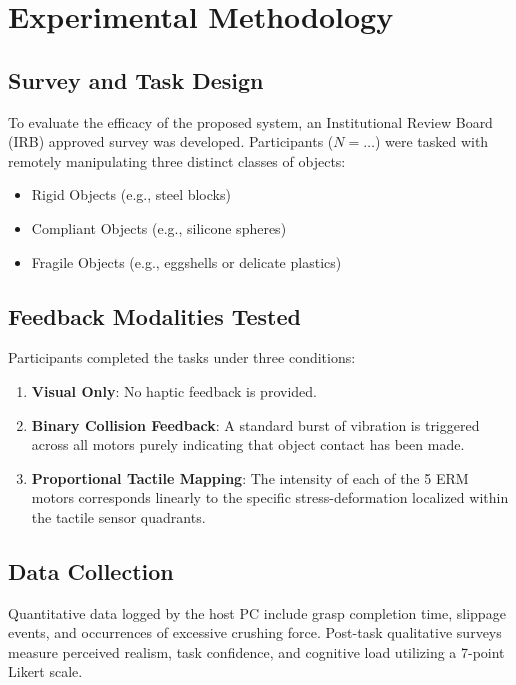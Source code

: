 \documentclass[12pt, a4paper]{report}
\begin{document}
\chapter{Experimental Methodology}
\section{Survey and Task Design}
To evaluate the efficacy of the proposed system, an Institutional Review Board (IRB) approved survey was developed. Participants ($N = \dots$) were tasked with remotely manipulating three distinct classes of objects:
\begin{itemize}
    \item Rigid Objects (e.g., steel blocks)
    \item Compliant Objects (e.g., silicone spheres)
    \item Fragile Objects (e.g., eggshells or delicate plastics)
\end{itemize}

\section{Feedback Modalities Tested}
Participants completed the tasks under three conditions:
\begin{enumerate}
    \item \textbf{Visual Only}: No haptic feedback is provided.
    \item \textbf{Binary Collision Feedback}: A standard burst of vibration is triggered across all motors purely indicating that object contact has been made.
    \item \textbf{Proportional Tactile Mapping}: The intensity of each of the 5 ERM motors corresponds linearly to the specific stress-deformation localized within the tactile sensor quadrants.
\end{enumerate}

\section{Data Collection}
Quantitative data logged by the host PC include grasp completion time, slippage events, and occurrences of excessive crushing force. Post-task qualitative surveys measure perceived realism, task confidence, and cognitive load utilizing a 7-point Likert scale.
\end{document}
